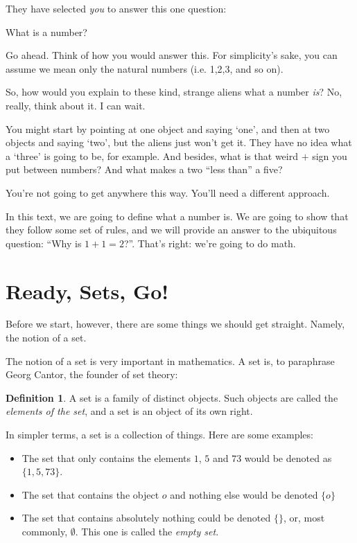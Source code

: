 \documentclass[12pt,a4paper]{article}
\theoremstyle{definition}
\newtheorem{definition}{Definition}
\theoremstyle{definition}
\theoremstyle{plain}
\theoremstyle{plain}
\begin{document}
	They have selected \emph{you} to answer this one question:
	
	\begin{center}
		{\Large What is a number?}
	\end{center}
	
	Go ahead. Think of how you would answer this. For simplicity's sake, you can assume we mean only the natural numbers (i.e. 1,2,3, and so on).
	
	So, how would you explain to these kind, strange aliens what a number \emph{is}? No, really, think about it. I can wait.
	
	\smallskip
	
	You might start by pointing at one object and saying `one', and then at two objects and saying `two', but the aliens just won't get it. They have no idea what a `three' is going to be, for example. And besides, what is that weird $+$ sign you put between numbers? And what makes a two ``less than'' a five?
	
	You're not going to get anywhere this way. You'll need a different approach.
	
	In this text, we are going to define what a number is. We are going to show that they follow some set of rules, and we will provide an answer to the ubiquitous question: ``Why is $1+1=2$?''. That's right: we're going to do math.
	
	\section {Ready, Sets, Go!}
	
	Before we start, however, there are some things we should get straight. Namely, the notion of a set.
	
	The notion of a set is very important in mathematics. A set is, to paraphrase Georg Cantor, the founder of set theory:
	
	\begin{definition}
		A set is a family of distinct objects. Such objects are called the \emph{elements of the set}, and a set is an object of its own right.
	\end{definition}
	
	In simpler terms, a set is a collection of things. Here are some examples:
	
	\begin{itemize}
		\item The set that only contains the elements $1$, $5$ and $73$ would be denoted as $\{1, 5, 73\}$.
		\item The set that contains the object $o$ and nothing else would be denoted $\{o\}$
		\item The set that contains absolutely nothing could be denoted $\{\}$, or, most commonly, $\emptyset$. This one is called the \emph{empty set}.
	\end{itemize}
	
\end{document}
